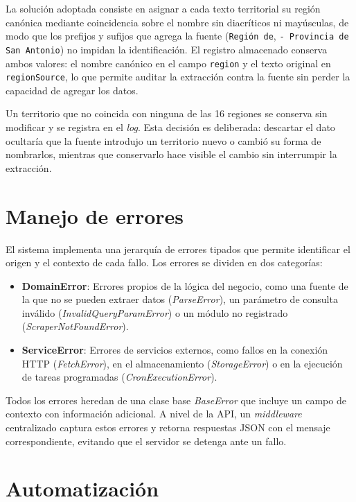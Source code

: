 \documentclass[12pt,letterpaper,oneside]{report}
\begin{document}
La soluci\'on adoptada consiste en asignar a cada texto territorial su regi\'on can\'onica mediante coincidencia sobre el nombre sin diacr\'iticos ni may\'usculas, de modo que los prefijos y sufijos que agrega la fuente (\texttt{Regi\'on de}, \texttt{- Provincia de San Antonio}) no impidan la identificaci\'on. El registro almacenado conserva ambos valores: el nombre can\'onico en el campo \texttt{region} y el texto original en \texttt{regionSource}, lo que permite auditar la extracci\'on contra la fuente sin perder la capacidad de agregar los datos.

Un territorio que no coincida con ninguna de las 16 regiones se conserva sin modificar y se registra en el \textit{log}. Esta decisi\'on es deliberada: descartar el dato ocultar\'ia que la fuente introdujo un territorio nuevo o cambi\'o su forma de nombrarlos, mientras que conservarlo hace visible el cambio sin interrumpir la extracci\'on.

\section{Manejo de errores}
\label{sec:errores}

El sistema implementa una jerarqu\'ia de errores tipados que permite identificar el origen y el contexto de cada fallo. Los errores se dividen en dos categor\'ias:

\begin{itemize}
  \item \textbf{DomainError}: Errores propios de la l\'ogica del negocio, como una fuente de la que no se pueden extraer datos (\textit{ParseError}), un par\'ametro de consulta inv\'alido (\textit{InvalidQueryParamError}) o un m\'odulo no registrado (\textit{ScraperNotFoundError}).
  \item \textbf{ServiceError}: Errores de servicios externos, como fallos en la conexi\'on HTTP (\textit{FetchError}), en el almacenamiento (\textit{StorageError}) o en la ejecuci\'on de tareas programadas (\textit{CronExecutionError}).
\end{itemize}

Todos los errores heredan de una clase base \textit{BaseError} que incluye un campo de contexto con informaci\'on adicional. A nivel de la API, un \textit{middleware} centralizado captura estos errores y retorna respuestas JSON con el mensaje correspondiente, evitando que el servidor se detenga ante un fallo.

\section{Automatizaci\'on}
\label{sec:automatizacion}
\end{document}
